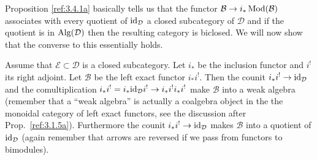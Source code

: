 \documentclass{amsproc}
\def\Bscr{{\mathcal B}}
\def\Dscr{{\mathcal D}}
\def\Escr{{\mathcal E}}
\def\Id{\text{id}}
\def\Mod{\mathop{\text{Mod}}}
\def\Alg{\mathop{\text{Alg}}}
\def\r{\rightarrow}
\let\oldtext\text
\def\text#1{\oldtext{\upshape #1}}
\theoremstyle{definition}
\theoremstyle{remark}
\numberwithin{equation}{section}
\numberwithin{table}{section}
\numberwithin{figure}{section}
\begin{document}
Proposition \ref{ref:3.4.1a} basically tells us that the functor
$\Bscr\r i_\ast\Mod(\Bscr)$ associates with every quotient of
$\Id_\Dscr$ a closed subcategory of $\Dscr$ and if the quotient is in
$\Alg(\Dscr)$ then the resulting category is biclosed. We will now
show that the converse to this essentially holds.

Assume that $\Escr\subset\Dscr$ is a closed subcategory. Let $i_\ast$ be the
inclusion functor and $i^!$ its right adjoint. Let $\Bscr$ be the left exact
functor $i_\ast i^!$. Then the counit $i_\ast i^!\r \Id_\Dscr$ and the
comultiplication
$i_\ast i^!=i_\ast\Id_\Dscr i^!\r i_\ast i^!i_\ast i^!$ make $\Bscr$
into a weak algebra (remember that a ``weak algebra'' is actually a
coalgebra object in the the monoidal category of left exact functors, see the
discussion after Prop.\ \ref{ref:3.1.5a}). Furthermore the counit $i_\ast i^!\r \Id_\Dscr$ makes
$\Bscr$ into a quotient of $\Id_\Dscr$ (again remember that arrows are reversed
if we pass from functors to bimodules).
\end{document}
